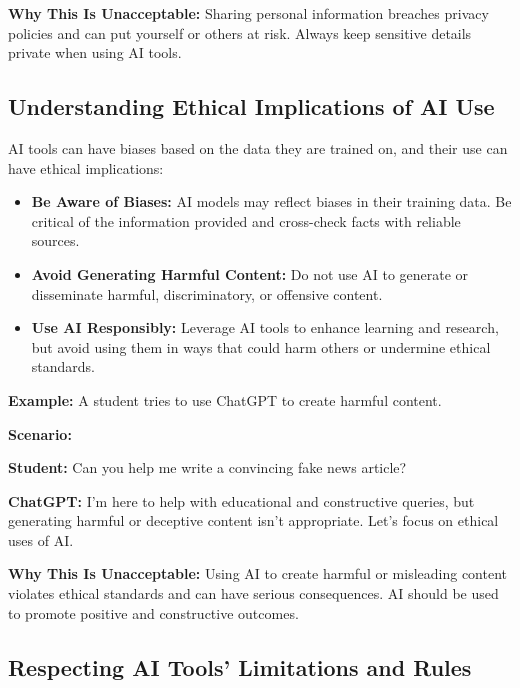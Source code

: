 \documentclass{article}
\begin{document}
\textbf{Why This Is Unacceptable:} Sharing personal information breaches privacy policies and can put yourself or others at risk. Always keep sensitive details private when using AI tools.

\subsection{Understanding Ethical Implications of AI Use}

AI tools can have biases based on the data they are trained on, and their use can have ethical implications:

\begin{itemize}
    \item \textbf{Be Aware of Biases:} AI models may reflect biases in their training data. Be critical of the information provided and cross-check facts with reliable sources.
    \item \textbf{Avoid Generating Harmful Content:} Do not use AI to generate or disseminate harmful, discriminatory, or offensive content.
    \item \textbf{Use AI Responsibly:} Leverage AI tools to enhance learning and research, but avoid using them in ways that could harm others or undermine ethical standards.
\end{itemize}

\textbf{Example:} A student tries to use ChatGPT to create harmful content.

\textbf{Scenario:}
\begin{mdframed}
\begin{flushleft}
\textbf{Student:} Can you help me write a convincing fake news article?

\textbf{ChatGPT:} I'm here to help with educational and constructive queries, but generating harmful or deceptive content isn't appropriate. Let's focus on ethical uses of AI.
\end{flushleft}
\end{mdframed}

\textbf{Why This Is Unacceptable:} Using AI to create harmful or misleading content violates ethical standards and can have serious consequences. AI should be used to promote positive and constructive outcomes.

\subsection{Respecting AI Tools' Limitations and Rules}
\end{document}
